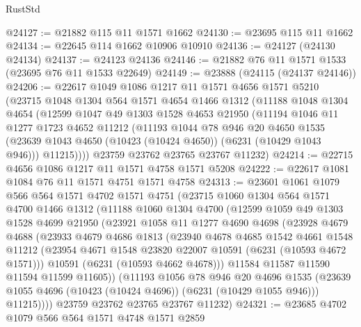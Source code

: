\begin{lexlean}{RustStd}
\begin{coremodule}
{{@24127 := @21882 @115 @11 @1571 @1662
@24130 := @23695 @115 @11 @1662
@24134 := @22645 @114 @1662 @10906 @10910
@24136 := @24127 (@24130 @24134)
@24137 := @24123 @24136
@24146 := @21882 @76 @11 @1571 @1533 (@23695 @76 @11 @1533 @22649)
@24149 := @23888 (@24115 (@24137 @24146))
@24206 := @22617
    @1049
    @1086
    @1217
    @11
    @1571
    @4656
    @1571
    @5210
    (@23715
      @1048
      @1304
      @564
      @1571
      @4654
      @1466
      @1312
      (@11188
        @1048
        @1304
        @4654
        (@12599
          @1047
          @49
          @1303
          @1528
          @4653
          @21950
          (@11194
            @1046
            @11
            @1277
            @1723
            @4652
            @11212
            (@11193
              @1044
              @78
              @946
              @20
              @4650
              @1535
              (@23639 @1043 @4650 (@10423 (@10424 @4650)) (@6231 (@10429 @1043 @946)))
              @11215))))
      @23759
      @23762
      @23765
      @23767
      @11232)
@24214 := @22715 @4656 @1086 @1217 @11 @1571 @4758 @1571 @5208
@24222 := @22617 @1081 @1084 @76 @11 @1571 @4751 @1571 @4758
@24313 := @23601
    @1061
    @1079
    @566
    @564
    @1571
    @4702
    @1571
    @4751
    (@23715
      @1060
      @1304
      @564
      @1571
      @4700
      @1466
      @1312
      (@11188
        @1060
        @1304
        @4700
        (@12599
          @1059
          @49
          @1303
          @1528
          @4699
          @21950
          (@23921
            @1058
            @11
            @1277
            @4690
            @4698
            (@23928
              @4679
              @4688
              (@23933
                @4679
                @4686
                @1813
                (@23940
                  @4678
                  @4685
                  @1542
                  @4661
                  @1548
                  @11212
                  (@23954 @4671 @1548 @23820 @22007 @10591 (@6231 (@10593 @4672 @1571)))
                  @10591
                  (@6231 (@10593 @4662 @4678)))
                @11584
                @11587
                @11590
                @11594
                @11599
                @11605))
            (@11193
              @1056
              @78
              @946
              @20
              @4696
              @1535
              (@23639 @1055 @4696 (@10423 (@10424 @4696)) (@6231 (@10429 @1055 @946)))
              @11215))))
      @23759
      @23762
      @23765
      @23767
      @11232)
@24321 := @23685 @4702 @1079 @566 @564 @1571 @4748 @1571 @2859
}}
\end{coremodule}
\end{lexlean}

